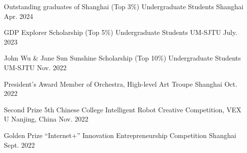 

\begin{cvhonors}  %
  \cvhonor
    {Outstanding graduates of Shanghai (Top 3\%)} %
    {Undergraduate Students} %
    {Shanghai} %
    {Apr. 2024} %

  \cvhonor
    {GDP Explorer Scholarship (Top 5\%)} %
    {Undergraduate Students} %
    {UM-SJTU} %
    {July. 2023} %

  \cvhonor
    {John Wu \& Jane Sun Sunshine Scholarship (Top 10\%)} %
    {Undergraduate Students} %
    {UM-SJTU} %
    {Nov. 2022} %

  \cvhonor
  {President's Award} %
  {Member of Orchestra, High-level Art Troupe} %
  {Shanghai} %
  {Oct. 2022} %

    \cvhonor
    {Second Prize} %
    {5th Chinese College Intelligent Robot Creative Competition, VEX U} %
    {Nanjing, China} %
    {Nov. 2022} %

  \cvhonor
  {Golden Prize} %
  {“Internet+” Innovation Entrepreneurship Competition} %
  {Shanghai} %
  {Sept. 2022} %






\end{cvhonors}
